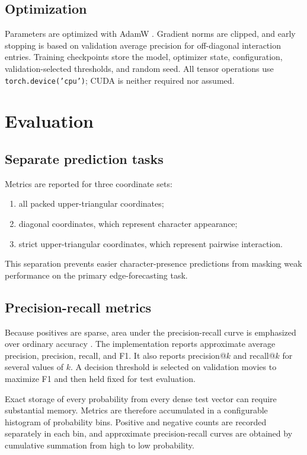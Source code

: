 \documentclass[11pt]{article}
\begin{document}
\subsection{Optimization}

Parameters are optimized with AdamW \cite{loshchilov2019adamw}. Gradient norms are clipped, and early stopping is based on validation average precision for off-diagonal interaction entries. Training checkpoints store the model, optimizer state, configuration, validation-selected thresholds, and random seed. All tensor operations use \texttt{torch.device('cpu')}; CUDA is neither required nor assumed.

\section{Evaluation}

\subsection{Separate prediction tasks}

Metrics are reported for three coordinate sets:

\begin{enumerate}[leftmargin=2em]
  \item all packed upper-triangular coordinates;
  \item diagonal coordinates, which represent character appearance;
  \item strict upper-triangular coordinates, which represent pairwise interaction.
\end{enumerate}

This separation prevents easier character-presence predictions from masking weak performance on the primary edge-forecasting task.

\subsection{Precision-recall metrics}

Because positives are sparse, area under the precision-recall curve is emphasized over ordinary accuracy \cite{saito2015pr}. The implementation reports approximate average precision, precision, recall, and F1. It also reports precision@$k$ and recall@$k$ for several values of $k$. A decision threshold is selected on validation movies to maximize F1 and then held fixed for test evaluation.

Exact storage of every probability from every dense test vector can require substantial memory. Metrics are therefore accumulated in a configurable histogram of probability bins. Positive and negative counts are recorded separately in each bin, and approximate precision-recall curves are obtained by cumulative summation from high to low probability.
\end{document}
